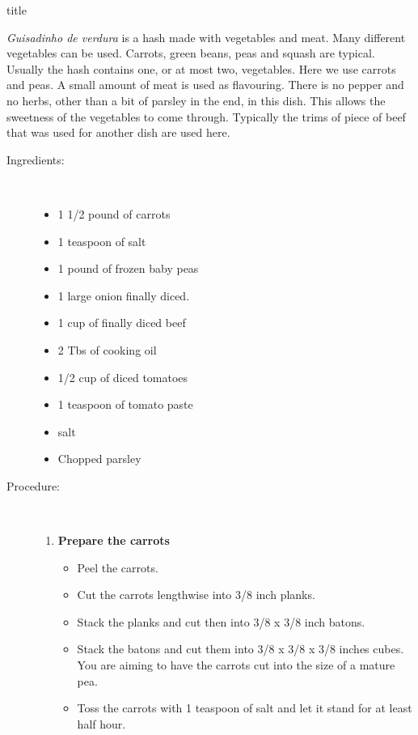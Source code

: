 \documentclass [11pt, letterpaper] {article}
\begin{document}
 {title}

{\it Guisadinho de verdura} is a hash made with vegetables and meat. Many different vegetables can be used. Carrots, green beans, peas and squash are typical. Usually the hash contains one, or at most two, vegetables. Here we use carrots and peas. A small amount of meat is used as flavouring. There is no pepper and no herbs, other than a bit of parsley in the end, in this dish. This allows the sweetness of the vegetables to come through. Typically the trims of piece of beef that was used for another dish are used here.

\vspace{.3in}
\begin{description}

\item[Ingredients:]\ \\
	\begin{itemize}
	\item	1 1/2 pound of carrots
	\item 1 teaspoon of salt
	\item 1 pound of frozen baby peas
	\item 1 large onion finally diced.
	\item 1 cup of finally diced beef
	\item 2 Tbs of cooking oil
	\item 1/2 cup of diced tomatoes
	\item 1 teaspoon of tomato paste
	\item salt
	\item Chopped parsley
	\end{itemize}

\item[Procedure:]\ \\

	\begin{enumerate}
	\item {\bf Prepare the carrots}
	\begin{itemize}
	\item Peel the carrots.
	\item Cut the carrots lengthwise into 3/8 inch planks.
	\item Stack the planks and cut then into 3/8 x 3/8 inch batons.
	\item Stack the batons and cut them into 3/8 x 3/8 x 3/8 inches cubes. You are aiming to have the carrots cut into the size of a mature pea.
	\item Toss the carrots with 1 teaspoon of salt and let it stand for at least half hour.
	\end{itemize}


\end{enumerate}
\end{description}
\end{document}
